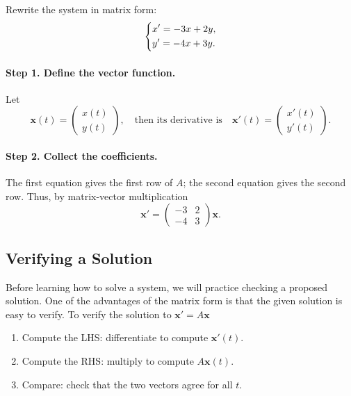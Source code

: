 \documentclass[11pt,letterpaper]{article}
\begin{document}
\begin{example}[1]{
Rewrite the system in matrix form:
\[
\begin{dcases}
x'=-3x+2y,\\
y'=-4x+3y.
\end{dcases}
\]
}

\paragraph{Step 1. Define the vector function.}
Let
\[
\mathbf{x}(t)=
\begin{pmatrix}x(t)\\y(t)\end{pmatrix},
\quad \text{then its derivative is}\quad 
\mathbf{x}'(t)=
\begin{pmatrix}x'(t)\\y'(t)\end{pmatrix}.
\]

\paragraph{Step 2. Collect the coefficients.}
The first equation gives the first row of $A$;
the second equation gives the second row. Thus, by matrix-vector multiplication
\[
\boxed{
\mathbf{x}'=
\begin{pmatrix}
-3&2\\-4&3
\end{pmatrix}\mathbf{x}.
}
\]
\end{example}


\subsection{Verifying a Solution}

Before learning how to solve a system, we will practice
checking a proposed solution. One of the advantages of the matrix form is that the given solution is easy to verify. To verify the solution to $\mathbf{x}'=A\mathbf{x}$
\begin{enumerate}
    \item Compute the LHS: differentiate to compute $\mathbf{x}'(t)$.
    \item Compute the RHS: multiply to compute $A\mathbf{x}(t)$.
    \item Compare: check that the two vectors agree for all $t$.
\end{enumerate}
\end{document}
